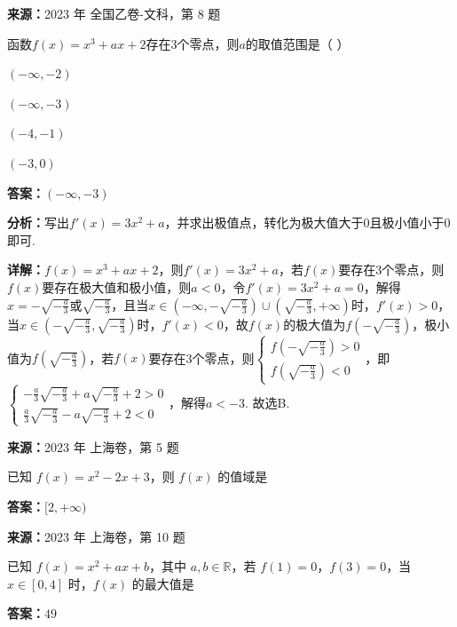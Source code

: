 \begin{question}[points=5]
\textbf{来源：}2023 年 全国乙卷-文科，第 8 题\par
函数$f(x)=x^3+ax+2$存在3个零点，则$a$的取值范围是（   ）
\begin{choices}
  \item $(-\infty,-2)$
  \item $(-\infty,-3)$
  \item $(-4,-1)$
  \item $(-3,0)$
\end{choices}
\begin{solution}
\textbf{答案：}$(-\infty,-3)$

\textbf{分析：}写出$f'(x)=3x^2+a$，并求出极值点，转化为极大值大于0且极小值小于0即可.

\textbf{详解：}$f(x)=x^3+ax+2$，则$f'(x)=3x^2+a$，若$f(x)$要存在3个零点，则$f(x)$要存在极大值和极小值，则$a<0$，令$f'(x)=3x^2+a=0$，解得$x=-\sqrt{-\frac{a}{3}}$或$\sqrt{-\frac{a}{3}}$，且当$x\in(-\infty,-\sqrt{-\frac{a}{3}})\cup(\sqrt{-\frac{a}{3}},+\infty)$时，$f'(x)>0$，当$x\in(-\sqrt{-\frac{a}{3}},\sqrt{-\frac{a}{3}})$时，$f'(x)<0$，故$f(x)$的极大值为$f(-\sqrt{-\frac{a}{3}})$，极小值为$f(\sqrt{-\frac{a}{3}})$，若$f(x)$要存在3个零点，则$\begin{cases}f(-\sqrt{-\frac{a}{3}})>0\\f(\sqrt{-\frac{a}{3}})<0\end{cases}$，即$\begin{cases}-\frac{a}{3}\sqrt{-\frac{a}{3}}+a\sqrt{-\frac{a}{3}}+2>0\\\frac{a}{3}\sqrt{-\frac{a}{3}}-a\sqrt{-\frac{a}{3}}+2<0\end{cases}$，解得$a<-3$. 故选B.
\end{solution}
\end{question}

\begin{question}[points=4]
\textbf{来源：}2023 年 上海卷，第 5 题\par
已知 $f(x)=x^2-2x+3$，则 $f(x)$ 的值域是
\fillin[{$[2,+\infty)$}]
\begin{solution}
\textbf{答案：}$[2,+\infty)$
\end{solution}
\end{question}

\begin{question}[points=5]
\textbf{来源：}2023 年 上海卷，第 10 题\par
已知 $f(x)=x^2+ax+b$，其中 $a,b\in \mathbb{R}$，若 $f(1)=0$，$f(3)=0$，当 $x\in[0,4]$ 时，$f(x)$ 的最大值是
\fillin[{$49$}]
\begin{solution}
\textbf{答案：}$49$
\end{solution}
\end{question}

